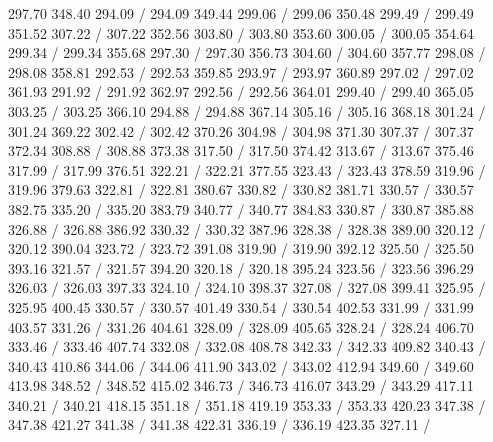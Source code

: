 { 297.70 348.40 294.09 /
 294.09 349.44 299.06 /
 299.06 350.48 299.49 /
 299.49 351.52 307.22 /
 307.22 352.56 303.80 /
 303.80 353.60 300.05 /
 300.05 354.64 299.34 /
 299.34 355.68 297.30 /
 297.30 356.73 304.60 /
 304.60 357.77 298.08 /
 298.08 358.81 292.53 /
 292.53 359.85 293.97 /
 293.97 360.89 297.02 /
 297.02 361.93 291.92 /
 291.92 362.97 292.56 /
 292.56 364.01 299.40 /
 299.40 365.05 303.25 /
 303.25 366.10 294.88 /
 294.88 367.14 305.16 /
 305.16 368.18 301.24 /
 301.24 369.22 302.42 /
 302.42 370.26 304.98 /
 304.98 371.30 307.37 /
 307.37 372.34 308.88 /
 308.88 373.38 317.50 /
 317.50 374.42 313.67 /
 313.67 375.46 317.99 /
 317.99 376.51 322.21 /
 322.21 377.55 323.43 /
 323.43 378.59 319.96 /
 319.96 379.63 322.81 /
 322.81 380.67 330.82 /
 330.82 381.71 330.57 /
 330.57 382.75 335.20 /
 335.20 383.79 340.77 /
 340.77 384.83 330.87 /
 330.87 385.88 326.88 /
 326.88 386.92 330.32 /
 330.32 387.96 328.38 /
 328.38 389.00 320.12 /
 320.12 390.04 323.72 /
 323.72 391.08 319.90 /
 319.90 392.12 325.50 /
 325.50 393.16 321.57 /
 321.57 394.20 320.18 /
 320.18 395.24 323.56 /
 323.56 396.29 326.03 /
 326.03 397.33 324.10 /
 324.10 398.37 327.08 /
 327.08 399.41 325.95 /
 325.95 400.45 330.57 /
 330.57 401.49 330.54 /
 330.54 402.53 331.99 /
 331.99 403.57 331.26 /
 331.26 404.61 328.09 /
 328.09 405.65 328.24 /
 328.24 406.70 333.46 /
 333.46 407.74 332.08 /
 332.08 408.78 342.33 /
 342.33 409.82 340.43 /
 340.43 410.86 344.06 /
 344.06 411.90 343.02 /
 343.02 412.94 349.60 /
 349.60 413.98 348.52 /
 348.52 415.02 346.73 /
 346.73 416.07 343.29 /
 343.29 417.11 340.21 /
 340.21 418.15 351.18 /
 351.18 419.19 353.33 /
 353.33 420.23 347.38 /
 347.38 421.27 341.38 /
 341.38 422.31 336.19 /
 336.19 423.35 327.11 /
}
